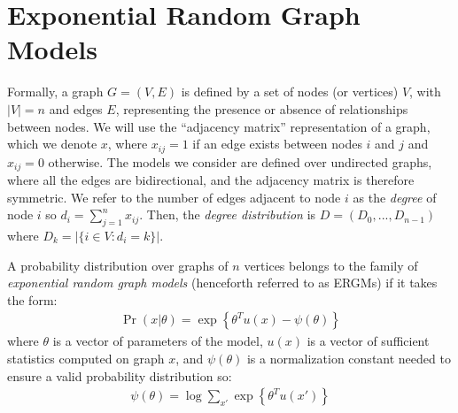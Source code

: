 \section{Exponential Random Graph Models}\label{sec:ergms}

Formally, a graph $G = (V,E)$ is defined by a set of nodes (or vertices) $V$, with $|V| = n$ and edges $E$, representing the presence or absence of relationships between nodes. We will use the ``adjacency matrix'' representation of a graph, which we denote $x$, where $x_{ij} = 1$ if an edge exists between nodes $i$ and $j$ and $x_{ij} = 0$ otherwise.  The models we consider are defined over undirected graphs, where all the edges are bidirectional, and the adjacency matrix is therefore symmetric. We refer to the number of edges adjacent to node $i$ as the \emph{degree} of node $i$ so $d_i = \sum_{j=1}^{n} x_{ij}$. Then, the \emph{degree distribution} is $D = (D_0,...,D_{n-1})$ where $D_k = |\{i \in V : d_i = k \}|$.

\begin{definition}
\label{def:ergm_defn}
A probability distribution over graphs of $n$ vertices belongs to the family of \emph{exponential random graph models} (henceforth referred to as ERGMs) if it takes the form:
\begin{align*}
\Pr(x | \theta) = \exp\left\{\theta^T u(x) - \psi(\theta)  \right\}
\end{align*}
where $\theta$ is a vector of parameters of the model, $u(x)$ is a vector of sufficient statistics computed on graph $x$, and $\psi(\theta)$ is a normalization constant needed to ensure a valid probability distribution so:
\begin{align*}
\psi(\theta) = \log \sum_{x'} \exp\left\{\theta^T u(x') \right\}
\end{align*}
\end{definition}

 
